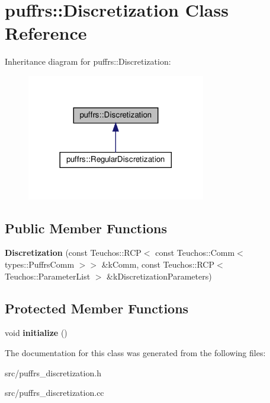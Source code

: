\hypertarget{classpuffrs_1_1Discretization}{}\section{puffrs\+:\+:Discretization Class Reference}
\label{classpuffrs_1_1Discretization}


Inheritance diagram for puffrs\+:\+:Discretization\+:
\nopagebreak
\begin{figure}[H]
\begin{center}
\leavevmode
\includegraphics[width=221pt]{classpuffrs_1_1Discretization__inherit__graph}
\end{center}
\end{figure}
\subsection*{Public Member Functions}
\begin{DoxyCompactItemize}
\item 
\mbox{\label{classpuffrs_1_1Discretization_a4da185868d21559de4d7a595d9a90bcf}} 
{\bfseries Discretization} (const Teuchos\+::\+R\+CP$<$ const Teuchos\+::\+Comm$<$ types\+::\+Puffrs\+Comm $>$$>$ \&k\+Comm, const Teuchos\+::\+R\+CP$<$ Teuchos\+::\+Parameter\+List $>$ \&k\+Discretization\+Parameters)
\end{DoxyCompactItemize}
\subsection*{Protected Member Functions}
\begin{DoxyCompactItemize}
\item 
\mbox{\label{classpuffrs_1_1Discretization_ac349695d441491e509fb7cb772ae9891}} 
void {\bfseries initialize} ()
\end{DoxyCompactItemize}


The documentation for this class was generated from the following files\+:\begin{DoxyCompactItemize}
\item 
src/puffrs\+\_\+discretization.\+h\item 
src/puffrs\+\_\+discretization.\+cc\end{DoxyCompactItemize}
